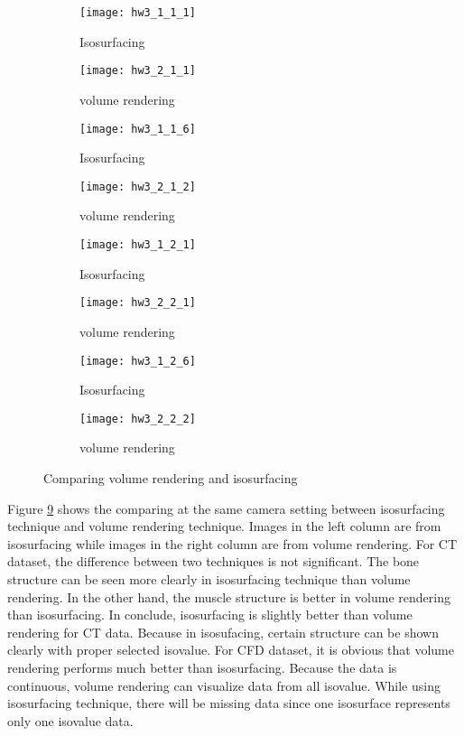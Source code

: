 \documentclass[11pt]{article}
\begin{document}
\begin{figure}[H]
\begin{subfigure}{.5\textwidth}
  \centering
  \texttt{[image: hw3\_1\_1\_1]}
  \caption{Isosurfacing}
  \label{fig:hw3_1_1_1}
\end{subfigure}
\begin{subfigure}{.5\textwidth}
  \centering
  \texttt{[image: hw3\_2\_1\_1]}
  \caption{volume rendering}
  \label{fig:hw3_2_1_1}
\end{subfigure}

\begin{subfigure}{.5\textwidth}
  \centering
  \texttt{[image: hw3\_1\_1\_6]}
  \caption{Isosurfacing}
  \label{fig:hw3_1_1_6}
\end{subfigure}
\begin{subfigure}{.5\textwidth}
  \centering
  \texttt{[image: hw3\_2\_1\_2]}
  \caption{volume rendering}
  \label{fig:hw3_2_1_2}
\end{subfigure}

\begin{subfigure}{.5\textwidth}
  \centering
  \texttt{[image: hw3\_1\_2\_1]}
  \caption{Isosurfacing}
  \label{fig:hw3_1_2_1}
\end{subfigure}
\begin{subfigure}{.5\textwidth}
  \centering
  \texttt{[image: hw3\_2\_2\_1]}
  \caption{volume rendering}
  \label{fig:hw3_2_2_1}
\end{subfigure}

\begin{subfigure}{.5\textwidth}
  \centering
  \texttt{[image: hw3\_1\_2\_6]}
  \caption{Isosurfacing}
  \label{fig:hw3_1_2_6}
\end{subfigure}
\begin{subfigure}{.5\textwidth}
  \centering
  \texttt{[image: hw3\_2\_2\_2]}
  \caption{volume rendering}
  \label{fig:hw3_2_2_2}
\end{subfigure}

\caption{Comparing volume rendering and isosurfacing}
\label{fig:hw3_3}
\end{figure}

Figure \ref{fig:hw3_3} shows the comparing at the same camera setting between isosurfacing technique and volume rendering technique. Images in the left column are from isosurfacing while images in the right column are from volume rendering.
For CT dataset, the difference between two techniques is not significant. The bone structure can be seen more clearly in isosurfacing technique than volume rendering. In the other hand, the muscle structure is better in volume rendering than isosurfacing. In conclude, isosurfacing is slightly better than volume rendering for CT data. Because in isosufacing, certain structure can be shown clearly with proper selected isovalue.
For CFD dataset, it is obvious that volume rendering performs much better than isosurfacing. Because the data is continuous, volume rendering can visualize data from all isovalue. While using isosurfacing technique, there will be missing data since one isosurface represents only one isovalue data.
\end{document}
